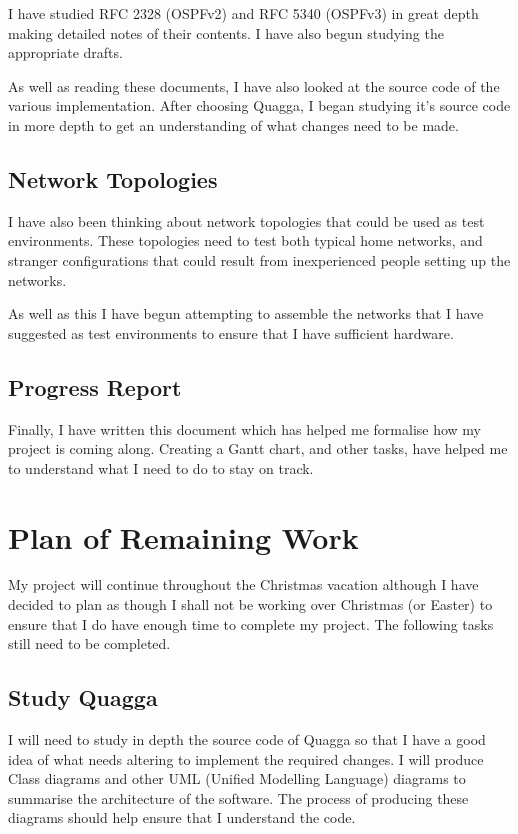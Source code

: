 \documentclass[12pt]{report}
\begin{document}
I have studied RFC 2328 (OSPFv2) and RFC 5340 (OSPFv3) in great depth making
detailed notes of their contents. I have also begun studying the appropriate
drafts.

As well as reading these documents, I have also looked at the source code of the
various implementation. After choosing Quagga, I began studying it's source code
in more depth to get an understanding of what changes need to be made. 

\section{Network Topologies}
I have also been thinking about network topologies that could be
used as test environments. These topologies need to test both typical home
networks, and stranger configurations that could result from inexperienced
people setting up the networks. 
 
As well as this I have begun attempting to assemble the networks that I have
suggested as test environments to ensure that I have sufficient hardware. 

\section{Progress Report}
Finally, I have written this document which has helped me formalise how my
project is coming along. Creating a Gantt chart, and other tasks, have helped me
to understand what I need to do to stay on track.

\chapter{Plan of Remaining Work}
My project will continue throughout the Christmas vacation although I have
decided to plan as though I shall not be working over Christmas (or Easter) to
ensure that I do have enough time to complete my project. The following tasks
still need to be completed.

\section{Study Quagga}
I will need to study in depth the source code of Quagga so that I have a
good idea of what needs altering to implement the required changes. I will
produce Class diagrams and other UML (Unified Modelling Language)
 diagrams to 
summarise the architecture of the software. The process of producing these
diagrams should help ensure that I understand the code. 
\end{document}
